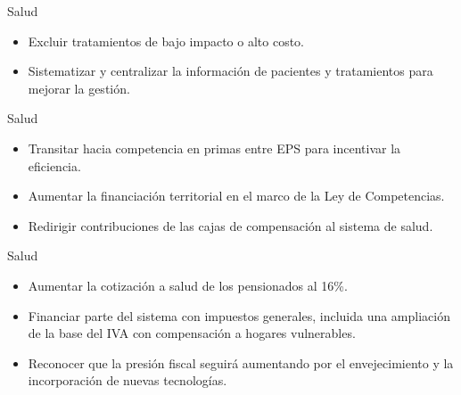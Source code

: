 \begin{frame}{Salud}
\begin{itemize}
    \item Excluir tratamientos de bajo impacto o alto costo.
    \item Sistematizar y centralizar la información de pacientes y tratamientos para mejorar la gestión.
\end{itemize}
\end{frame}

\begin{frame}{Salud}
\begin{itemize}
    \item Transitar hacia competencia en primas entre EPS para incentivar la eficiencia.
    \item Aumentar la financiación territorial en el marco de la Ley de Competencias.
    \item Redirigir contribuciones de las cajas de compensación al sistema de salud.
\end{itemize}
\end{frame}

\begin{frame}{Salud}
\begin{itemize}
    \item Aumentar la cotización a salud de los pensionados al 16\%.
    \item Financiar parte del sistema con impuestos generales, incluida una ampliación de la base del IVA con compensación a hogares vulnerables.
    \item Reconocer que la presión fiscal seguirá aumentando por el envejecimiento y la incorporación de nuevas tecnologías.
\end{itemize}
\end{frame}